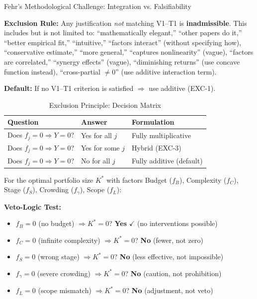 \begin{chapter}{Fehr's Methodological Challenge: Integration vs. Falsifiability}
\begin{axiom}
\textbf{Exclusion Rule:} Any justification \textit{not} matching V1--T1 is \textbf{inadmissible}. This includes but is not limited to: ``mathematically elegant,'' ``other papers do it,'' ``better empirical fit,'' ``intuitive,'' ``factors interact'' (without specifying how), ``conservative estimate,'' ``more general,'' ``captures nonlinearity'' (vague), ``factors are correlated,'' ``synergy effects'' (vague), ``diminishing returns'' (use concave function instead), ``cross-partial $\neq 0$'' (use additive interaction term).

\textbf{Default:} If no V1--T1 criterion is satisfied $\Rightarrow$ use additive (EXC-1).
\end{axiom}

\begin{table}[h!]
\centering
\caption{Exclusion Principle: Decision Matrix}
\label{tab:exc-decision-matrix}
\renewcommand{\arraystretch}{1.3}
\begin{tabular}{@{}lll@{}}
\toprule
\textbf{Question} & \textbf{Answer} & \textbf{Formulation} \\
\midrule
Does $f_j = 0 \Rightarrow Y = 0$? & Yes for all $j$ & Fully multiplicative \\
Does $f_j = 0 \Rightarrow Y = 0$? & Yes for some $j$ & Hybrid (EXC-3) \\
Does $f_j = 0 \Rightarrow Y = 0$? & No for all $j$ & Fully additive (default) \\
\bottomrule
\end{tabular}
\end{table}

\begin{example}
\label{ex:kstar-exclusion}
For the optimal portfolio size $K^*$ with factors Budget ($f_B$), Complexity ($f_C$), Stage ($f_S$), Crowding ($f_\gamma$), Scope ($f_L$):

\textbf{Veto-Logic Test:}
\begin{itemize}[noitemsep]
    \item $f_B = 0$ (no budget) $\Rightarrow K^* = 0$? \textbf{Yes} $\checkmark$ (no interventions possible)
    \item $f_C = 0$ (infinite complexity) $\Rightarrow K^* = 0$? \textbf{No} (fewer, not zero)
    \item $f_S = 0$ (wrong stage) $\Rightarrow K^* = 0$? \textbf{No} (less effective, not impossible)
    \item $f_\gamma = 0$ (severe crowding) $\Rightarrow K^* = 0$? \textbf{No} (caution, not prohibition)
    \item $f_L = 0$ (scope mismatch) $\Rightarrow K^* = 0$? \textbf{No} (adjustment, not veto)
\end{itemize}


\end{example}
\end{chapter}
